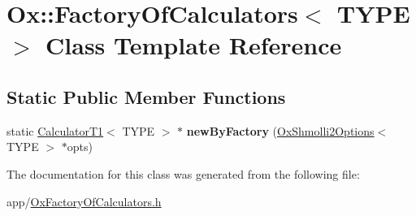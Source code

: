 \hypertarget{class_ox_1_1_factory_of_calculators}{\section{Ox\-:\-:Factory\-Of\-Calculators$<$ T\-Y\-P\-E $>$ Class Template Reference}
\label{class_ox_1_1_factory_of_calculators}
}
\subsection*{Static Public Member Functions}
\begin{DoxyCompactItemize}
\item 
\hypertarget{class_ox_1_1_factory_of_calculators_a159e270eeece43f382d43224f5b02e68}{static \hyperlink{class_ox_1_1_calculator_t1}{Calculator\-T1}$<$ T\-Y\-P\-E $>$ $\ast$ {\bfseries new\-By\-Factory} (\hyperlink{struct_ox_1_1_ox_shmolli2_options}{Ox\-Shmolli2\-Options}$<$ T\-Y\-P\-E $>$ $\ast$opts)}\label{class_ox_1_1_factory_of_calculators_a159e270eeece43f382d43224f5b02e68}

\end{DoxyCompactItemize}


The documentation for this class was generated from the following file\-:\begin{DoxyCompactItemize}
\item 
app/\hyperlink{_ox_factory_of_calculators_8h}{Ox\-Factory\-Of\-Calculators.\-h}\end{DoxyCompactItemize}
